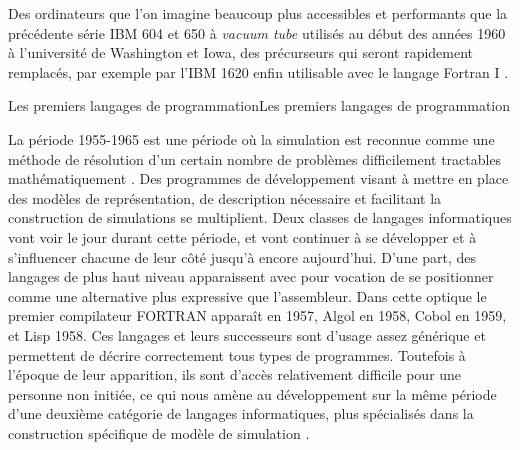 Des ordinateurs que l'on imagine beaucoup plus accessibles et performants que la précédente série IBM 604 et 650 \autocite[584]{Barnes2004b} à \textit{vacuum tube} utilisés au début des années 1960 à l'université de Washington et Iowa, des précurseurs qui seront rapidement remplacés, par exemple par l'IBM 1620 enfin utilisable avec le langage Fortran I \autocite[66]{Berry2005}.

\pagebreak

\begin{testiv}{Les premiers langages de programmation}{Les premiers langages de programmation}

La période 1955-1965 est une période où la simulation est reconnue comme une méthode de résolution d'un certain nombre de problèmes difficilement tractables mathématiquement \autocites{Nance1993, Ackoff1961}. Des programmes de développement visant à mettre en place des modèles de représentation, de description nécessaire et facilitant la construction de simulations se multiplient. Deux classes de langages informatiques vont voir le jour durant cette période, et vont continuer à se développer et à s'influencer chacune de leur côté jusqu'à encore aujourd'hui. D'une part, des langages de plus haut niveau apparaissent avec pour vocation de se positionner comme une alternative plus expressive que l'assembleur. Dans cette optique le premier compilateur FORTRAN apparaît en 1957,  Algol en 1958, Cobol en 1959, et Lisp 1958. Ces langages et leurs successeurs sont d'usage assez générique et permettent de décrire correctement tous types de programmes. Toutefois à l'époque de leur apparition, ils sont d'accès relativement difficile pour une personne non initiée, ce qui nous amène au développement sur la même période d'une deuxième catégorie de langages informatiques, plus spécialisés dans la construction spécifique de modèle de simulation \autocite[239]{Naylor1966}.


\end{testiv}
